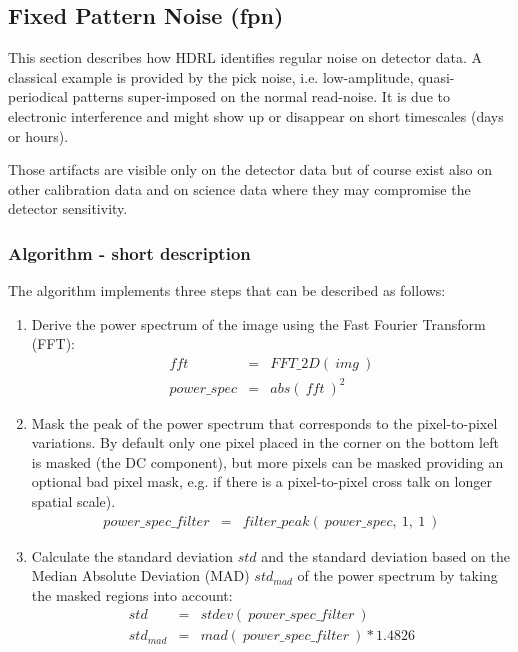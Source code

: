 \subsection{Fixed Pattern Noise (fpn)}
\label{patternnoise:main}

This section describes how HDRL identifies regular
noise on detector data. A classical example is provided by the pick noise,
i.e. low-amplitude, quasi-periodical patterns super-imposed on the
normal read-noise. It is due to electronic interference and might show
up or disappear on short timescales (days or hours).

Those artifacts are visible only on the detector data but of course
exist also on other calibration data and on science data where they
may compromise the detector sensitivity.


\subsubsection{Algorithm - short description}

The algorithm implements three steps that can be described as follows:

\begin{enumerate}\itemsep-1pt \parskip0pt \small
\item Derive the power spectrum of the image using the Fast Fourier
  Transform (FFT):
    \begin{eqnarray*}
      fft                 & = & FFT\_2D(\ img\ ) \\
      power\_spec         & = & abs(\ fft\ )^2
    \end{eqnarray*}
  \item Mask the peak of the power spectrum that corresponds to 
    the pixel-to-pixel variations. By default only one pixel
    placed in the corner on the bottom left is masked (the DC
    component), but more pixels can be masked providing an
    optional bad pixel mask, e.g. if there is a pixel-to-pixel 
    cross talk on longer spatial scale).
    \begin{eqnarray*}
      power\_spec\_filter & = & filter\_peak(\ power\_spec,\ 1,\ 1\ )
    \end{eqnarray*}
  \item Calculate the standard deviation $std$ and the standard
    deviation based on the Median Absolute Deviation (MAD) $std_{mad}$
    of the power spectrum by taking the masked regions into account:
    \begin{eqnarray*}
      std                  & = & stdev(\ power\_spec\_filter\ ) \\
      std_{mad}             & = & mad(\ power\_spec\_filter\ ) * 1.4826
    \end{eqnarray*}
\end{enumerate}

